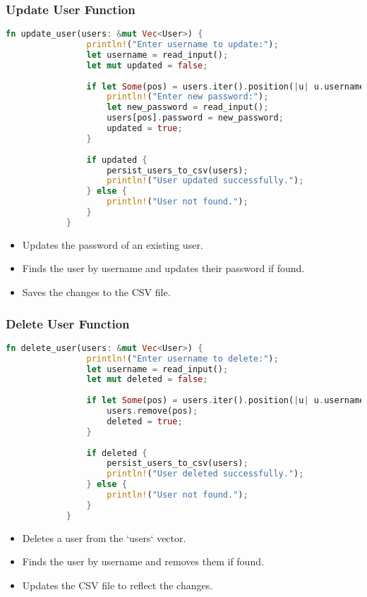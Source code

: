 \documentclass[aspectratio=169, table]{beamer}
\begin{document}
	\begin{frame}[fragile]
		\frametitle{Update User Function}
		\begin{lstlisting}[language=Rust]
			fn update_user(users: &mut Vec<User>) {
				println!("Enter username to update:");
				let username = read_input();
				let mut updated = false;
				
				if let Some(pos) = users.iter().position(|u| u.username == username) {
					println!("Enter new password:");
					let new_password = read_input();
					users[pos].password = new_password;
					updated = true;
				}
				
				if updated {
					persist_users_to_csv(users);
					println!("User updated successfully.");
				} else {
					println!("User not found.");
				}
			}
		\end{lstlisting}
		\begin{itemize}
			\item Updates the password of an existing user.
			\item Finds the user by username and updates their password if found.
			\item Saves the changes to the CSV file.
		\end{itemize}
	\end{frame}
	
	\begin{frame}[fragile]
		\frametitle{Delete User Function}
		\begin{lstlisting}[language=Rust]
			fn delete_user(users: &mut Vec<User>) {
				println!("Enter username to delete:");
				let username = read_input();
				let mut deleted = false;
				
				if let Some(pos) = users.iter().position(|u| u.username == username) {
					users.remove(pos);
					deleted = true;
				}
				
				if deleted {
					persist_users_to_csv(users);
					println!("User deleted successfully.");
				} else {
					println!("User not found.");
				}
			}
		\end{lstlisting}
		\begin{itemize}
			\item Deletes a user from the `users` vector.
			\item Finds the user by username and removes them if found.
			\item Updates the CSV file to reflect the changes.
		\end{itemize}
	\end{frame}
	
\end{document}

